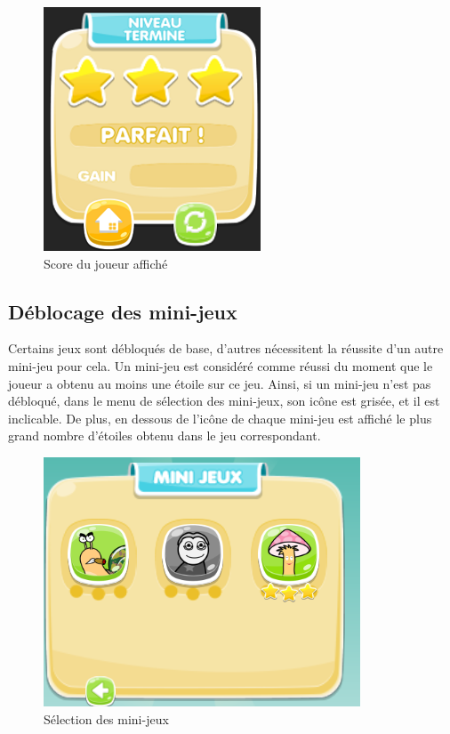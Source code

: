 \begin{figure}[H]\centering
  \includegraphics[scale=.9]{./img/MenuMort.png}
  \caption{Score du joueur affiché}
  \label{SelectionMiniJeu}
\end{figure}

\subsection{Déblocage des mini-jeux}

Certains jeux sont débloqués de base, d'autres nécessitent la réussite d'un autre mini-jeu pour cela. Un mini-jeu est considéré comme réussi du moment que le joueur a obtenu au moins une étoile sur ce jeu. Ainsi, si un mini-jeu n'est pas débloqué, dans le menu de sélection des mini-jeux, son icône est grisée, et il est inclicable. De plus, en dessous de l'icône de chaque mini-jeu est affiché le plus grand nombre d'étoiles obtenu dans le jeu correspondant.

\begin{figure}[H]\centering
  \includegraphics[scale=.9]{./img/SelectionMiniJeu.png}
  \caption{Sélection des mini-jeux}
  \label{SelectionMiniJeu}
\end{figure}

